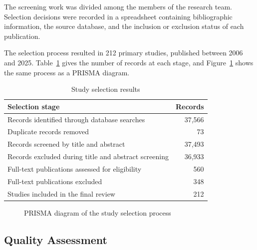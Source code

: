 \documentclass[sigconf,review]{acmart}
\begin{document}
The screening work was divided among the members of the research team. Selection decisions were recorded in a spreadsheet containing bibliographic information, the source database, and the inclusion or exclusion status of each publication.

The selection process resulted in 212 primary studies, published between 2006 and 2025. Table~\ref{tab:study-selection} gives the number of records at each stage, and Figure~\ref{fig:prisma} shows the same process as a PRISMA diagram.

\begin{table}[t]
    \centering
    \caption{Study selection results}
    \label{tab:study-selection}
    \begin{tabular}{@{}p{}r@{}}
        \toprule
        \textbf{Selection stage} & \textbf{Records} \\
        \midrule
        Records identified through database searches & 37,566 \\
        Duplicate records removed & 73 \\
        Records screened by title and abstract & 37,493 \\
        Records excluded during title and abstract screening & 36,933 \\
        Full-text publications assessed for eligibility & 560 \\
        Full-text publications excluded & 348 \\
        Studies included in the final review & 212 \\
        \bottomrule
    \end{tabular}
\end{table}

\begin{figure}[t]
    \centering
    \resizebox{\columnwidth}{!}{}
    \caption{PRISMA diagram of the study selection process}
    \label{fig:prisma}
\end{figure}

\subsection{Quality Assessment}
\label{subsec:quality-assessment}
\end{document}
